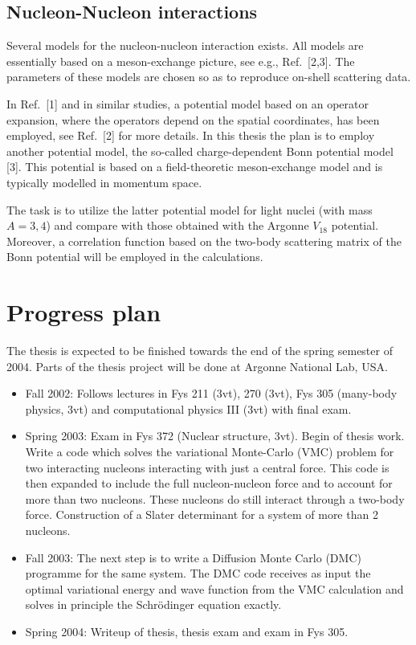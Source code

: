 \subsection*{Nucleon-Nucleon interactions}
Several models for the nucleon-nucleon interaction exists.
All models are essentially based on a meson-exchange picture, see 
e.g., Ref.~[2,3]. The parameters
of these models are chosen so as to reproduce on-shell scattering data.

In Ref.~[1] and in similar studies, a potential model based on an operator
expansion, where the operators depend on the spatial coordinates,
has been employed, see Ref.~[2] for more details.  
In this thesis the plan is to employ another potential model,
the so-called charge-dependent Bonn potential model [3]. This potential
is based on a field-theoretic meson-exchange model and is typically 
modelled in momentum space.

The task is to utilize 
the latter potential model for light nuclei (with mass
$A=3,4$) and compare with those obtained
with the Argonne $V_{18}$ potential.
Moreover, a correlation function based on the two-body scattering matrix
of the Bonn potential will be employed in the calculations.

\section*{Progress plan}
The thesis is expected to be finished towards the end  of the spring 
semester of 2004.
Parts of the thesis project will be done
at Argonne National Lab, USA.
\begin{itemize}
\item Fall 2002: Follows lectures in Fys 211 (3vt), 270 (3vt), 
      Fys 305 (many-body physics, 3vt) and
      computational physics III (3vt) with final exam.  
\item Spring 2003:  Exam in Fys 372 (Nuclear structure, 3vt). Begin
      of thesis work.
      Write a code which solves the variational Monte-Carlo (VMC) problem
      for two interacting nucleons interacting with just a central force.
      This code is then expanded to include the full nucleon-nucleon force 
      and to account for more than two
      nucleons. These nucleons do still interact through a two-body force.
      Construction of a Slater determinant for a system of more than 2
      nucleons.
\item Fall 2003: The next step is to write a Diffusion 
                 Monte Carlo (DMC) programme for the 
      same system. 
      The DMC code receives as input the optimal 
     variational energy and wave function from the VMC calculation and solves
     in principle the Schr\"odinger equation exactly.

\item Spring 2004: Writeup of thesis, thesis exam and exam in Fys 305.

\end{itemize}

